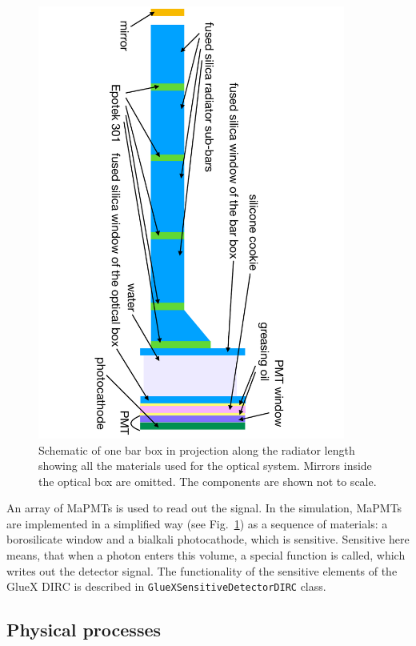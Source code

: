 \documentclass[11pt, a4paper]{article}
\begin{document}
\begin{figure}[!h]
\centering
\includegraphics[angle=90,width=0.9\textwidth]{pics/struct1_crop.pdf}
\caption{\label{pic:struct}
Schematic of one bar box in projection along the radiator length showing all the materials used for the optical system. Mirrors inside the optical box are omitted. The components are shown not to scale.
}
\end{figure}

An array of MaPMTs is used to read out the signal. In the simulation, MaPMTs are implemented in a simplified way (see Fig.~\ref{pic:struct}) as a sequence of materials: a borosilicate window and a bialkali photocathode, which is sensitive. Sensitive here means, that when a photon enters this volume, a special function is called, which writes out the detector signal. The functionality of the sensitive elements of the GlueX DIRC is described in \texttt{GlueXSensitiveDetectorDIRC} class.


\subsection{Physical processes}
\end{document}
